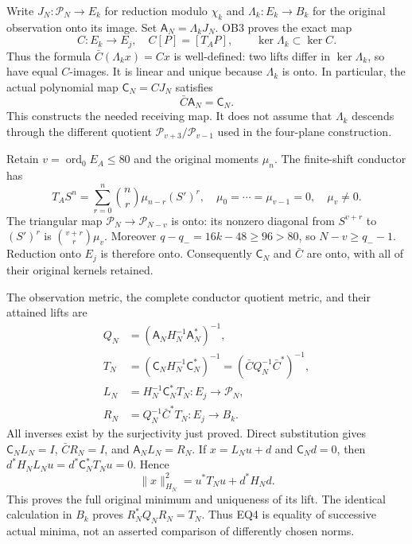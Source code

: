 \documentclass[11pt]{article}
\newcommand{\Pp}{\mathcal P}
\begin{document}
Write $J_N:\Pp_N\to E_k$ for reduction modulo $\chi_k$ and
$\Lambda_k:E_k\to B_k$ for the original observation onto its image.
Set $\mathsf A_N=\Lambda_kJ_N$. OB3 proves the exact map
\[
 C:E_k\longrightarrow E_j,\quad C[P]=[T_AP],\qquad
 \ker\Lambda_k\subset\ker C.                                      \tag{EQ1}
\]
Thus the formula $\bar C(\Lambda_kx)=Cx$ is well-defined: two lifts
differ in $\ker\Lambda_k$, so have equal $C$-images. It is linear
and unique because $\Lambda_k$ is onto. In particular, the actual
polynomial map $\mathsf C_N=CJ_N$ satisfies
\[
 \bar C\mathsf A_N=\mathsf C_N.                                    \tag{EQ2}
\]
This constructs the needed receiving map. It does not assume that
$\Lambda_k$ descends through the different quotient
$\Pp_{v+3}/\Pp_{v-1}$ used in the four-plane construction.

Retain $v=\operatorname{ord}_0E_A\le80$ and the original moments
$\mu_n$. The finite-shift conductor has
\[
 T_A S^n=\sum_{r=0}^n\binom nr\mu_{n-r}(S')^r,
 \quad\mu_0=\cdots=\mu_{v-1}=0,\quad\mu_v\ne0.                    \tag{EQ3}
\]
The triangular map $\Pp_N\to\Pp_{N-v}$ is onto: its nonzero
diagonal from $S^{v+r}$ to $(S')^r$ is
$\binom{v+r}{r}\mu_v$. Moreover
$q-q_-=16k-48\ge96>80$, so $N-v\ge q_--1$.
Reduction onto $E_j$ is therefore onto. Consequently $\mathsf C_N$
and $\bar C$ are onto, with all of their original kernels retained.

The observation metric, the complete conductor quotient metric, and
their attained lifts are
\[
 \begin{split}
 Q_N&=(\mathsf A_NH_N^{-1}\mathsf A_N^*)^{-1},\\
 T_N&=(\mathsf C_NH_N^{-1}\mathsf C_N^*)^{-1}
       =(\bar C Q_N^{-1}\bar C^*)^{-1},\\
 L_N&=H_N^{-1}\mathsf C_N^*T_N:E_j\longrightarrow\Pp_N,\\
 R_N&=Q_N^{-1}\bar C^*T_N:E_j\longrightarrow B_k.
 \end{split}                                                       \tag{EQ4}
\]
All inverses exist by the surjectivity just proved. Direct substitution
gives $\mathsf C_NL_N=I$, $\bar CR_N=I$, and
$\mathsf A_NL_N=R_N$. If $x=L_Nu+d$ and $\mathsf C_Nd=0$, then
$d^*H_NL_Nu=d^*\mathsf C_N^*T_Nu=0$. Hence
\[
 \|x\|_{H_N}^2=u^*T_Nu+d^*H_Nd.                                  \tag{EQ5}
\]
This proves the full original minimum and uniqueness of its lift.
The identical calculation in $B_k$ proves
$R_N^*Q_NR_N=T_N$. Thus EQ4 is equality of successive actual
minima, not an asserted comparison of differently chosen norms.
\end{document}
